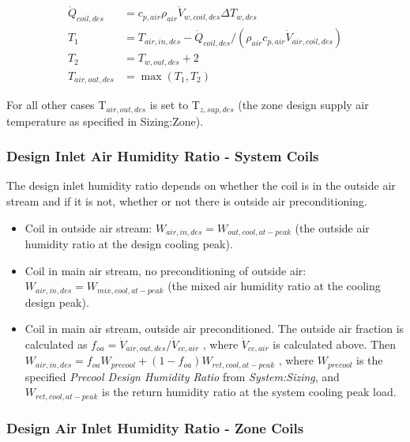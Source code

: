 \begin{equation}
 \begin{array}{rl}
  \dot{Q}_{coil,des} & = c_{p,air}\rho_{air}\dot{V}_{w,coil,des}\Delta T_{w,des} \\
  T_1 & = T_{air,in,des} - \dot{Q}_{coil,des} / \left(\rho_{air}c_{p,air}\dot V_{air,coil,des}\right) \\
  T_2 & = T_{w,out,des} + 2 \\
  T_{air,out,des} & = \max \left(T_1,T_2\right)
 \end{array}
\end{equation}

For all other cases T\(_{air,out,des}\) is set to T\(_{z,sup,des}\) (the zone design supply air temperature as specified in Sizing:Zone).

\subsubsection{Design Inlet Air Humidity Ratio - System Coils}\label{design-inlet-air-humidity-ratio---system-coils}

The design inlet humidity ratio depends on whether the coil is in the outside air stream and if it is not, whether or not there is outside air preconditioning.

\begin{itemize}
\item
  Coil in outside air stream: \(W_{air,in,des} = W_{out,cool,at-peak}\) (the outside air humidity ratio at the design cooling peak).
\item
  Coil in main air stream, no preconditioning of outside air: \(W_{air,in,des} = W_{mix,cool,at-peak}\) (the mixed air humidity ratio at the cooling design peak).
\item
  Coil in main air stream, outside air preconditioned. The outside air fraction is calculated as \(f_{oa} = \dot V_{air,out,des}/\dot V_{cc,air}\) , where \(\dot V_{cc,air}\) is calculated above. Then \(W_{air,in,des} = f_{oa}W_{precool}+\left(1-f_{oa}\right)W_{ret,cool,at-peak}\) , where \(W_{precool}\) is the specified \emph{Precool Design Humidity Ratio} from \emph{System:Sizing}, and \(W_{ret,cool,at-peak}\) is the return humidity ratio at the system cooling peak load.
\end{itemize}

\subsubsection{Design Air Inlet Humidity Ratio - Zone Coils}\label{design-air-inlet-humidity-ratio---zone-coils}

